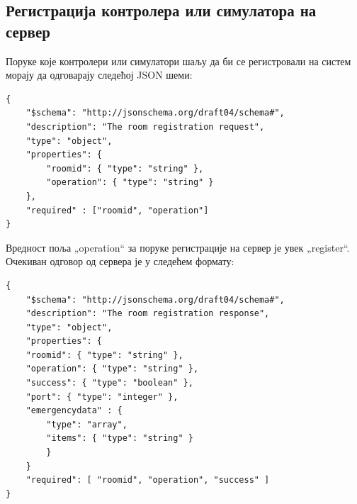 \documentclass[a4paper, 12pt, diplomski]{etfcyr}
\def\quote#1{„#1“}
\begin{document}
			\newpage

			\subsection{Регистрација контролера или симулатора на сервер}
				\begin{justify}
					Поруке које контролери или симулатори шаљу да би се регистровали на систем морају да одговарају следећој JSON шеми:
					\begin{lstlisting}
{
	"$schema": "http://json­schema.org/draft­04/schema#",
	"description": "The room registration request",
	"type": "object",
	"properties": {
		"room­id": { "type": "string" },
		"operation": { "type": "string" }
	},
	"required" : ["room­id", "operation"]
}
					\end{lstlisting}
					Вредност поља \quote{operation} за поруке регистрације на сервер је увек \quote{register}.
					Очекиван одговор од сервера је у следећем формату:
					\begin{lstlisting}
{
	"$schema": "http://json­schema.org/draft­04/schema#",
	"description": "The room registration response",
	"type": "object",
	"properties": {
	"room­id": { "type": "string" },
	"operation": { "type": "string" },
	"success": { "type": "boolean" },
	"port": { "type": "integer" },
	"emergency­data" : {
		"type": "array",
		"items": { "type": "string" }
		}
	}
	"required": [ "room­id", "operation", "success" ]
}
					\end{lstlisting}
				\end{justify}

			\newpage
\end{document}
